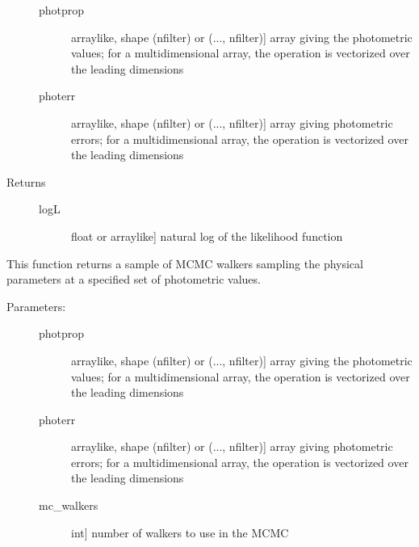 \documentclass[letterpaper,10pt,english]{sphinxmanual}
\begin{document}
\begin{fulllineitems}
\begin{fulllineitems}
\begin{description}
\begin{description}
\item[{photprop}] \leavevmode{[}arraylike, shape (nfilter) or (..., nfilter){]}
array giving the photometric values; for a
multidimensional array, the operation is vectorized over
the leading dimensions

\item[{photerr}] \leavevmode{[}arraylike, shape (nfilter) or (..., nfilter){]}
array giving photometric errors; for a multidimensional
array, the operation is vectorized over the leading
dimensions

\end{description}

\item[{Returns}] \leavevmode\begin{description}
\item[{logL}] \leavevmode{[}float or arraylike{]}
natural log of the likelihood function

\end{description}

\end{description}

\end{fulllineitems}


\begin{fulllineitems}
\label{bayesphot:slugpy.bayesphot.bp.bp.mcmc}
This function returns a sample of MCMC walkers sampling the
physical parameters at a specified set of photometric values.
\begin{description}
\item[{Parameters:}] \leavevmode\begin{description}
\item[{photprop}] \leavevmode{[}arraylike, shape (nfilter) or (..., nfilter){]}
array giving the photometric values; for a
multidimensional array, the operation is vectorized over
the leading dimensions

\item[{photerr}] \leavevmode{[}arraylike, shape (nfilter) or (..., nfilter){]}
array giving photometric errors; for a multidimensional
array, the operation is vectorized over the leading
dimensions

\item[{mc\_walkers}] \leavevmode{[}int{]}
number of walkers to use in the MCMC


\end{description}
\end{description}
\end{fulllineitems}
\end{fulllineitems}
\end{document}
